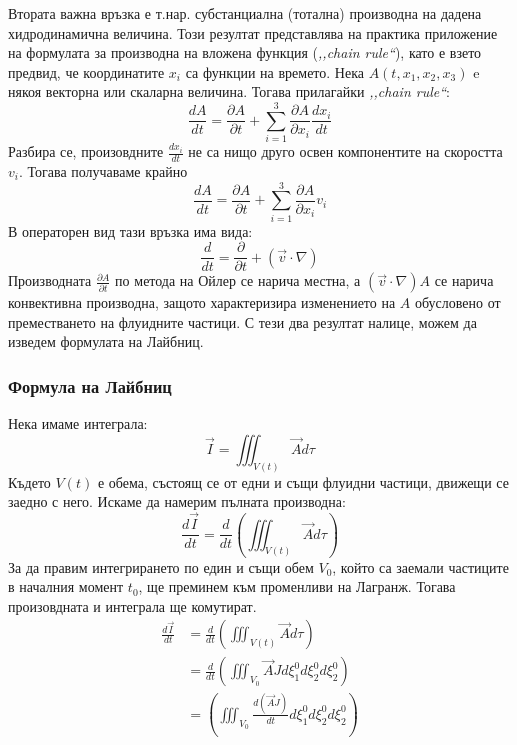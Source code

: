 Втората важна връзка е т.нар. субстанциална (тотална) производна на дадена хидродинамична величина. Този резултат представлява на практика приложение на формулата
за производна на вложена функция (\textit{,,chain rule``}), като е взето предвид, че координатите $x_i$ са функции на времето.
Нека $A(t, x_1,x_2,x_3)$ e някоя векторна или скаларна величина. Тогава прилагайки \textit{,,chain rule``}:
\begin{equation*}
	\frac{d A}{d t}=\frac{\partial A}{\partial t}+\sum _{i=1}^3 \frac{\partial A}{\partial x_i}\frac{d x_i}{d t}
\end{equation*}
Разбира се, произовдните $\frac{d x_i}{d t}$ не са нищо друго освен компонентите на скоростта $v_i$. Тогава получаваме крайно
\begin{equation}
	\label{eq:total_der}
	\frac{d A}{d t}=\frac{\partial A}{\partial t}+\sum _{i=1}^3 \frac{\partial A}{\partial x_i} v_i
\end{equation}
В операторен вид тази връзка има вида:
\begin{equation}
	\label{eq:total_der_op}
	\frac{d}{d t} = \frac{\partial}{\partial t} + (\vec{v} \cdot \nabla)
\end{equation}
Производната $\frac{\partial A}{\partial t}$ по метода на Ойлер се нарича местна, а $(\vec{v} \cdot \nabla)A$ се нарича конвективна производна, защото характеризира изменението на $A$ обусловено
от преместването на флуидните частици. С тези два резултат налице, можем да изведем формулата на Лайбниц.

\subsubsection{Формула на Лайбниц}
Нека имаме интеграла:
\begin{equation*}
	\vec{I} = \iiint_{V(t)} \vec{A} d \tau
\end{equation*}
Където $V(t)$ е обема, състоящ се от едни и същи флуидни частици, движещи се заедно с него. Искаме да намерим пълната производна:
\begin{equation*}
	\frac{d \vec{I}}{d t} = \frac{d}{d t}\left(\iiint_{V(t)} \vec{A} d \tau\right)
\end{equation*}
За да правим интегрирането по един и същи обем $V_0$, който са заемали частиците в началния момент $t_0$, ще преминем към променливи на Лагранж.
Тогава произовдната и интеграла ще комутират.
\begin{align*}
	\frac{d \vec{I}}{d t} & = \frac{d}{d t}\left(\iiint_{V(t)} \vec{A} d \tau\right) \\
	                      & = \frac{d}{d t}\left(\iiint_{V_0} \vec{A} J d \xi^0_1 d \xi^0_2 d \xi^0_2 \right) \\
                          & = \left(\iiint_{V_0} \frac{d(\vec{A} J) }{d t} d \xi^0_1 d \xi^0_2 d \xi^0_2 \right) 
\end{align*}